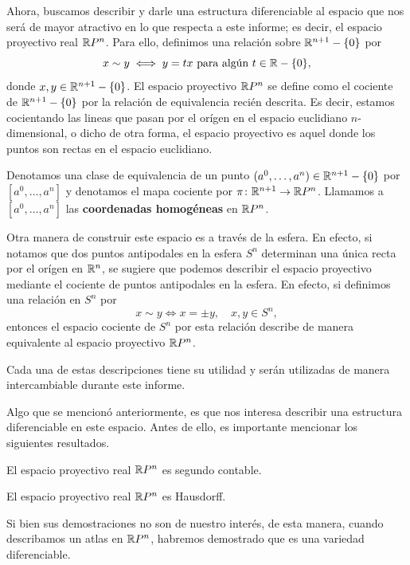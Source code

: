 Ahora, buscamos describir y darle una estructura diferenciable al espacio que nos será de mayor atractivo en lo que respecta a este informe; es decir, el espacio proyectivo real $\mathbb{R} P^{n}$. Para ello, definimos una relación sobre $\mathbb{R}^{n+1} - \{ 0 \}$ por
\[ x \sim y \iff y = tx \text{ para algún } t \in \mathbb{R} - \{ 0 \}, \]
donde $x,y \in \mathbb{R}^{n+1} - \{ 0 \}$. El espacio proyectivo $\mathbb{R} P^{n}$ se define como el cociente de $\mathbb{R}^{n+1} - \{ 0 \}$ por la relación de equivalencia recién descrita. Es decir, estamos cocientando las lineas que pasan por el orígen en el espacio euclidiano $n$-dimensional, o dicho de otra forma, el espacio proyectivo es aquel donde los puntos son rectas en el espacio euclidiano. \par
Denotamos una clase de equivalencia de un punto $(a^{0},\dots,a^{n}) \in \mathbb{R}^{n+1} - \{ 0 \}$ por $[a^{0},\dots,a^{n}]$ y denotamos el mapa cociente por $\pi \colon \mathbb{R}^{n+1} \to \mathbb{R} P^{n}$. Llamamos a $[a^{0},\dots,a^{n}]$ las \textbf{coordenadas homogéneas} en $\mathbb{R} P^{n}$. \par
Otra manera de construir este espacio es a través de la esfera. En efecto, si notamos que dos puntos antipodales en la esfera $S^{n}$ determinan una única recta por el orígen en $\mathbb{R}^{n}$, se sugiere que podemos describir el espacio proyectivo mediante el cociente de puntos antipodales en la esfera. En efecto, si definimos una relación en $S^{n}$ por
\[ x \sim y \iff x = \pm y, \quad x,y \in S^{n}, \]
entonces el espacio cociente de $S^{n}$ por esta relación describe de manera equivalente al espacio proyectivo $\mathbb{R} P^{n}$. \par
Cada una de estas descripciones tiene su utilidad y serán utilizadas de manera intercambiable durante este informe. \par
Algo que se mencionó anteriormente, es que nos interesa describir una estructura diferenciable en este espacio. Antes de ello, es importante mencionar los siguientes resultados.

\begin{lemma}
	El espacio proyectivo real $\mathbb{R} P^{n}$ es segundo contable.
\end{lemma}

\begin{lemma}
	El espacio proyectivo real $\mathbb{R} P^{n}$ es Hausdorff.
\end{lemma}

Si bien sus demostraciones no son de nuestro interés, de esta manera, cuando describamos un atlas en $\mathbb{R} P^{n}$, habremos demostrado que es una variedad diferenciable.

